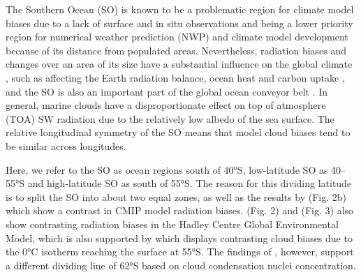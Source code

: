 \documentclass[12pt,a4paper]{article}
\begin{document}
The Southern Ocean (SO) is known to be a problematic region for climate model
biases \citep{schuddeboom2021,hyder2018,cesana2022,zhao2022} due to a lack of
surface and in situ observations and being a lower priority region for
numerical weather prediction (NWP) and climate model development because of its
distance from populated areas. Nevertheless, radiation biases and changes over
an area of its size have a substantial influence on the global climate
\citep{rintoul2011}, such as affecting the Earth radiation balance, ocean heat
and carbon uptake \citep{williams2023}, and the SO is also an important part of the
global ocean conveyor belt \citep{wang2014}. In general, marine clouds have a
disproportionate effect on top of atmosphere (TOA) SW radiation due to the
relatively low albedo of the sea surface.  The relative longitudinal symmetry
of the SO means that model cloud biases tend to be similar across longitudes.

Here, we refer to the SO as ocean regions south of 40°S,
low-latitude SO as 40--55°S and high-latitude SO as south of 55°S. The reason
for this dividing latitude is to split the SO into about two equal zones, as
well as the results by \cite{schuddeboom2021} (Fig. 2b) which show a contrast in
CMIP model radiation biases. \cite{schuddeboom2019} (Fig. 2) and
\cite{kuma2020} (Fig. 3) also show contrasting radiation biases in the Hadley
Centre Global Environmental Model, which is also supported by \cite{cesana2022} which  displays contrasting cloud biases due to the 0°C isotherm reaching the surface at 55°S. The findings
of \cite{niu2024}, however, support a different dividing line of 62°S based on
cloud condensation nuclei concentration.
\end{document}
